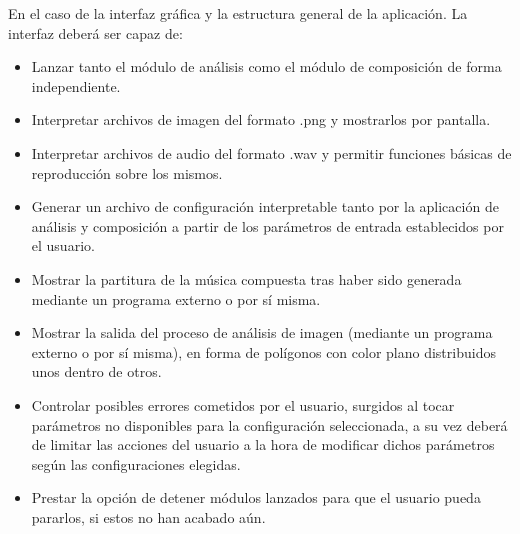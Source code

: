 	En el caso de la interfaz gráfica y la estructura general de la aplicación. La interfaz deberá ser capaz de:
	
	 \begin{itemize}
		 \item Lanzar tanto el módulo de análisis como el módulo de composición de forma independiente.
		 \item Interpretar archivos de imagen del formato .png y mostrarlos por pantalla.
		 \item Interpretar archivos de audio del formato .wav y permitir funciones básicas de reproducción sobre los mismos.
		 \item Generar un archivo de configuración interpretable tanto por la aplicación de análisis y composición a partir de los parámetros de entrada establecidos por el usuario.
		 \item Mostrar la partitura de la música compuesta tras haber sido generada mediante un programa externo o por sí misma.
		 \item Mostrar la salida del proceso de análisis de imagen (mediante un programa externo o por sí misma), en forma de polígonos con color plano distribuidos unos dentro de otros.
		 \item Controlar posibles errores cometidos por el usuario, surgidos al tocar parámetros no disponibles para la configuración seleccionada, a su vez deberá de limitar las acciones del usuario a la hora de modificar dichos parámetros según las configuraciones elegidas.
		 \item Prestar la opción de detener módulos lanzados para que el usuario pueda pararlos, si estos no han acabado aún.
	 \end{itemize}
	 
